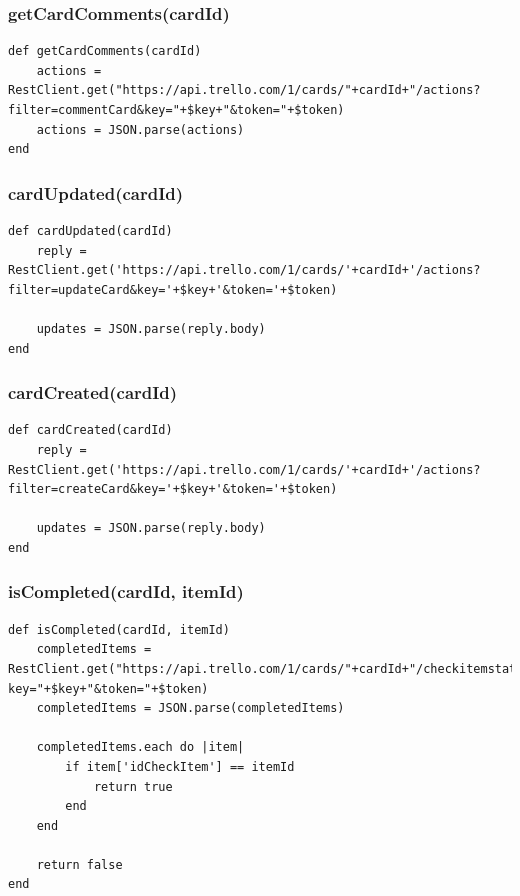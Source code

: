 \subsubsection{getCardComments(cardId)}
\begin{lstlisting}[aboveskip=1\baselineskip, caption= getCardComments(), label=listing052]
def getCardComments(cardId)
	actions = RestClient.get("https://api.trello.com/1/cards/"+cardId+"/actions?filter=commentCard&key="+$key+"&token="+$token)
	actions = JSON.parse(actions)
end
\end{lstlisting}

\subsubsection{cardUpdated(cardId)}
\begin{lstlisting}[aboveskip=1\baselineskip, caption= cardUpdated(), label=listing053]
def cardUpdated(cardId)
	reply = RestClient.get('https://api.trello.com/1/cards/'+cardId+'/actions?filter=updateCard&key='+$key+'&token='+$token)

	updates = JSON.parse(reply.body)
end
\end{lstlisting}

\subsubsection{cardCreated(cardId)}
\begin{lstlisting}[aboveskip=1\baselineskip, caption= cardCreated(), label=listing054]
def cardCreated(cardId)
	reply = RestClient.get('https://api.trello.com/1/cards/'+cardId+'/actions?filter=createCard&key='+$key+'&token='+$token)

	updates = JSON.parse(reply.body)
end
\end{lstlisting}

\subsubsection{isCompleted(cardId, itemId)}
\begin{lstlisting}[aboveskip=1\baselineskip, caption= isCompleted(), label=listing055]
def isCompleted(cardId, itemId)
	completedItems = RestClient.get("https://api.trello.com/1/cards/"+cardId+"/checkitemstates?key="+$key+"&token="+$token)
	completedItems = JSON.parse(completedItems)

	completedItems.each do |item|
		if item['idCheckItem'] == itemId
			return true
		end
	end

	return false
end
\end{lstlisting}

